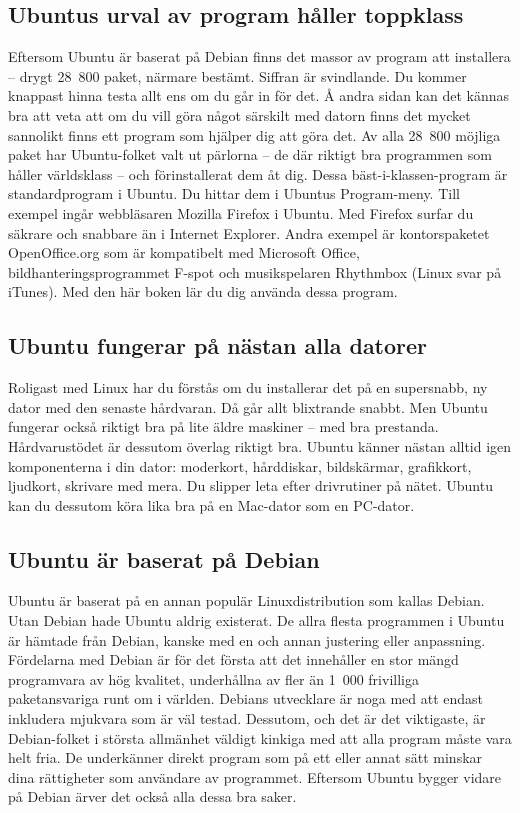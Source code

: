 \documentclass[a4paper,final]{memoir} %
\newcommand\xpackagecount{28~800} %
\begin{document}
\subsection{Ubuntus urval av program håller toppklass}

Eftersom Ubuntu är baserat på Debian finns det massor av program att installera -- drygt \xpackagecount{} paket, närmare bestämt. Siffran är svindlande. Du kommer knappast hinna testa allt ens om du går in för det. Å andra sidan kan det kännas bra att veta att om du vill göra något särskilt med datorn finns det mycket sannolikt finns ett program som hjälper dig att göra det. Av alla \xpackagecount{} möjliga paket har Ubuntu-folket valt ut pärlorna -- de där riktigt bra programmen som håller världsklass -- och förinstallerat dem åt dig. Dessa bäst-i-klassen-program är standardprogram i Ubuntu. Du hittar dem i Ubuntus Program-meny. Till exempel ingår webbläsaren Mozilla Firefox i Ubuntu. Med Firefox surfar du säkrare och snabbare än i Internet Explorer. Andra exempel är kontorspaketet OpenOffice.org som är kompatibelt med Microsoft Office, bildhanteringsprogrammet F-spot och musikspelaren Rhythmbox (Linux svar på iTunes). Med den här boken lär du dig använda dessa program.

\subsection{Ubuntu fungerar på nästan alla datorer}

Roligast med Linux har du förstås om du installerar det på en supersnabb, ny dator med den senaste hårdvaran. Då går allt blixtrande snabbt. Men Ubuntu fungerar också riktigt bra på lite äldre maskiner -- med bra prestanda. Hårdvarustödet är dessutom överlag riktigt bra. Ubuntu känner nästan alltid igen komponenterna i din dator: moderkort, hårddiskar, bildskärmar, grafikkort, ljudkort, skrivare med mera. Du slipper leta efter drivrutiner på nätet. Ubuntu kan du dessutom köra lika bra på en Mac-dator som en PC-dator.  


\subsection{Ubuntu är baserat på Debian}


Ubuntu är baserat på en annan populär Linuxdistribution som kallas Debian. Utan Debian hade Ubuntu aldrig existerat. De allra flesta programmen i Ubuntu är hämtade från Debian, kanske med en och annan justering eller anpassning. Fördelarna med Debian är för det första att det innehåller en stor mängd programvara av hög kvalitet, underhållna av fler än 1~000 frivilliga paketansvariga runt om i världen. Debians utvecklare är noga med att endast inkludera mjukvara som är väl testad. Dessutom, och det är det viktigaste, är Debian-folket i största allmänhet väldigt kinkiga med att alla program måste vara helt fria. De underkänner direkt program som på ett eller annat sätt minskar dina rättigheter som användare av programmet. Eftersom Ubuntu bygger vidare på Debian ärver det också alla dessa bra saker.
\end{document}
